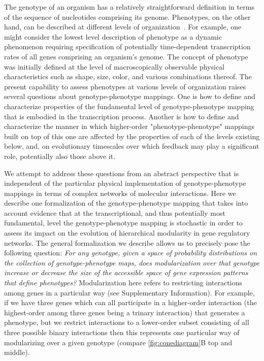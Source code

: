 The genotype of an organism has a relatively straightforward definition in terms of the sequence of nucleotides comprising its genome. Phenotypes, on the other hand, can be described at different levels of organization~\cite{Dawkins1982,Stadler2001}. For example, one might consider the lowest level description of phenotype as a dynamic phenomenon requiring specification of potentially time-dependent transcription rates of all genes comprising an organism's genome. The concept of phenotype was initially defined at the level of macroscopically observable physical characteristics such as shape, size, color, and various combinations thereof. The present capability to assess phenotypes at various levels of organization raises several questions about genotype-phenotype mappings. One is how to define and characterize properties of the fundamental level of genotype-phenotype mapping that is embodied in the transcription process. Another is how to define and characterize the manner in which higher-order "phenotype-phenotype" mappings built on top of this one are affected by the properties of each of the levels existing below, and, on evolutionary timescales over which feedback may play a significant role, potentially also those above it.

We attempt to address these questions from an abstract perspective that is independent of the particular physical implementation of genotype-phenotype mappings in terms of complex networks of molecular interactions. Here we describe one formalization of the genotype-phenotype mapping that takes into account evidence that at the transcriptional, and thus potentially most fundamental, level the genotype-phenotype mapping is stochastic \cite{Swain2002,Paulsson2004,Thattai2004,Acar2008a,Lestas2010,So2011,Munsky2012,Neuert2013,Sanchez2013} in order to assess its impact on the evolution of hierarchical modularity in gene regulatory networks. The general formalization we describe allows us to precisely pose the following question: \emph{For any genotype, given a space of probability distributions on the collection of genotype-phenotype maps, does modularization over that genotype increase or decrease the size of the accessible space of gene expression patterns that define phenotypes?} Modularization here refers to restricting interactions among genes in a particular way (see Supplementary Information). For example, if we have three genes which can all participate in a higher-order interaction (the highest-order among three genes being a trinary interaction) that generates a phenotype, but we restrict interactions to a lower-order subset consisting of all three possible binary interactions then this represents one particular way of modularizing over a given genotype (compare \ref{fig:conediagram}B top and middle).

